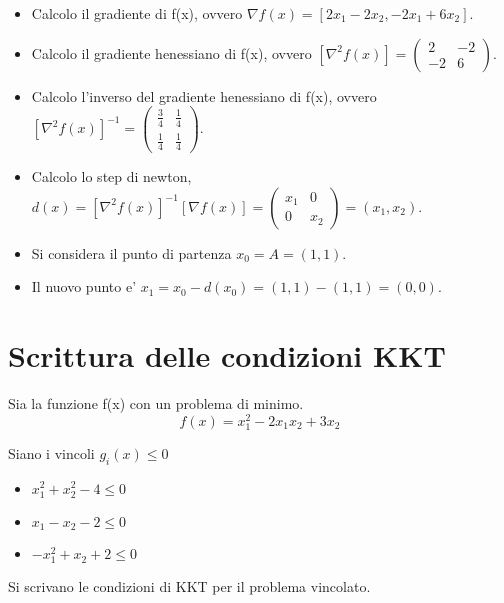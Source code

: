 \begin{itemize}
  \item Calcolo il gradiente di f(x), ovvero $\nabla f(x) = [2 x_1 - 2 x_2, -2 x_1 + 6 x_2]$.
  \item Calcolo il gradiente henessiano di f(x), ovvero $[\nabla ^ 2 f(x)] = \begin{pmatrix} 2 & -2 \\ -2 & 6 \end{pmatrix}$.
    \item Calcolo l'inverso del gradiente henessiano di f(x), ovvero $[\nabla ^ 2 f(x)]^{-1} = \begin{pmatrix} \frac 3 4 & \frac 1 4 \\ \frac 1 4 & \frac 1 4 \end{pmatrix}$.
      \item Calcolo lo step di newton, $d(x) = [\nabla ^ 2 f(x)]^{-1} [\nabla f(x)] = \begin{pmatrix} x_1 & 0 \\ 0 & x_2 \end{pmatrix} = (x_1, x_2)$.
  \item Si considera il punto di partenza $x_0 = A = (1,1)$.
  \item Il nuovo punto e' $x_1 = x_0 - d(x_0) = (1,1) - (1, 1) = (0,0)$.
\end{itemize}

\section{Scrittura delle condizioni KKT}

Sia la funzione f(x) con un problema di minimo.
\[
  f(x) = x_1 ^ 2 - 2 x_1 x_2 + 3 x_2
\]

Siano i vincoli $g_i(x) \leq 0$

\begin{itemize}
  \item $x_1^2 + x_2^2 - 4 \leq 0$
  \item $x_1 - x_2 - 2 \leq 0$
  \item $- x_1^2 + x_2 + 2 \leq 0$
\end{itemize}

Si scrivano le condizioni di KKT per il problema vincolato.

